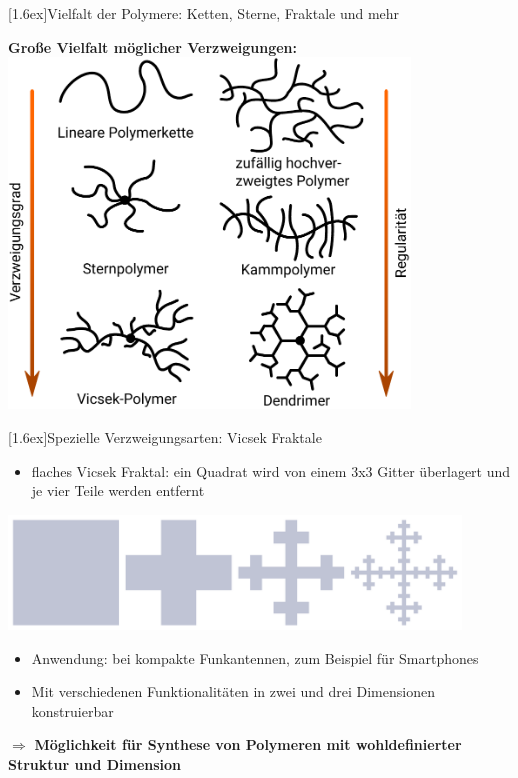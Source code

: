 \documentclass[final]{beamer}
\newlength{\columnheight}
\newlength{\marginw}
\newlength{\tw}
\newlength{\colw}
\newenvironment{myTwoColPoster}{%
  \begin{minipage}[t]{\textwidth}%
    \hspace*{\marginw}%
    \hspace*{9.5bp}%
    \begin{minipage}[t]{\tw}}%
  {\end{minipage}%
   \hspace*{\marginw}%
   \end{minipage}}
\newenvironment{myCol}%
    {\begin{minipage}[t][\columnheight][t]{\colw}}%
    {\end{minipage}}
\newenvironment{textblock}[1]%
    {\begin{block}{\rule[-0.6ex]{0pt}{2.4ex}\raisebox{-0.25ex}[1.6ex]{#1}}%
     \vspace*{5mm}}%
    {\vspace*{5mm}\end{block}}
\begin{document}
\begin{frame}[t]{}
\begin{myTwoColPoster}
\begin{myCol}
\begin{textblock}{Vielfalt der Polymere: Ketten, Sterne, Fraktale und mehr}
    \begin{center}
      \textbf{\Large Große Vielfalt möglicher Verzweigungen:}
      \includegraphics[width=0.8\textwidth]{fig/PolymerTypes_DE2}
    \end{center}
  \end{textblock}

  \begin{textblock}{Spezielle Verzweigungsarten: Vicsek Fraktale}
    \begin{itemize}\setlength\itemsep{1.4em}\large
      \item flaches Vicsek Fraktal: ein Quadrat wird von einem 3x3 Gitter überlagert und je vier Teile werden entfernt
    \end{itemize}
      \begin{center}
        \includegraphics[width=0.9\textwidth]{fig/vicsek_construction}
      \end{center}
    \begin{itemize}\setlength\itemsep{1.4em}\large
      \item Anwendung: bei kompakte Funkantennen, zum Beispiel für Smartphones 
      \item Mit verschiedenen Funktionalitäten in zwei und drei Dimensionen konstruierbar
    \end{itemize}
    \vspace*{3cm}
    $\Rightarrow$ \textbf{\textcolor{IPForange}{\Large Möglichkeit für Synthese von Polymeren mit wohldefinierter Struktur und Dimension}}
  \end{textblock}


\end{myCol}
\end{myTwoColPoster}
\end{frame}
\end{document}

